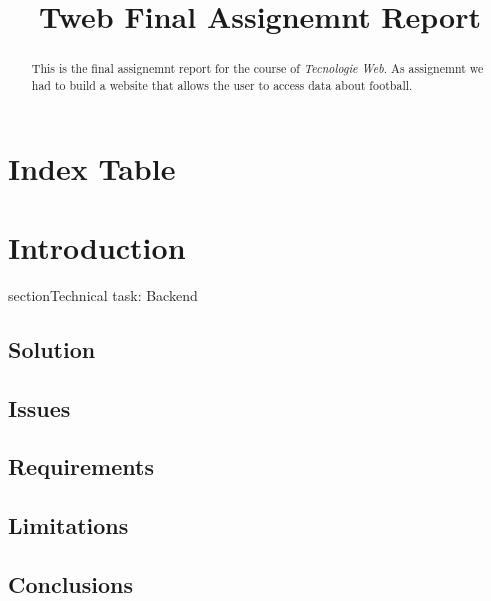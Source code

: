\documentclass[conference]{IEEEtran}
\begin{document}
\title{Tweb Final Assignemnt Report}

\author{
}

\maketitle

\begin{abstract}
This is the final assignemnt report for the course of \textit{Tecnologie Web}.
As assignemnt we had to build a website that allows the user to  access data about football.
\end{abstract}

\section*{Index Table}
\tableofcontents

\section{Introduction}
section{Technical task: Backend}
\subsection{Solution}
\lipsum[4] %

\subsection{Issues}
\lipsum[5] %

\subsection{Requirements}
\lipsum[6] %

\subsection{Limitations}
\lipsum[7] %

\subsection{Conclusions}
\lipsum[8] %
\end{document}
